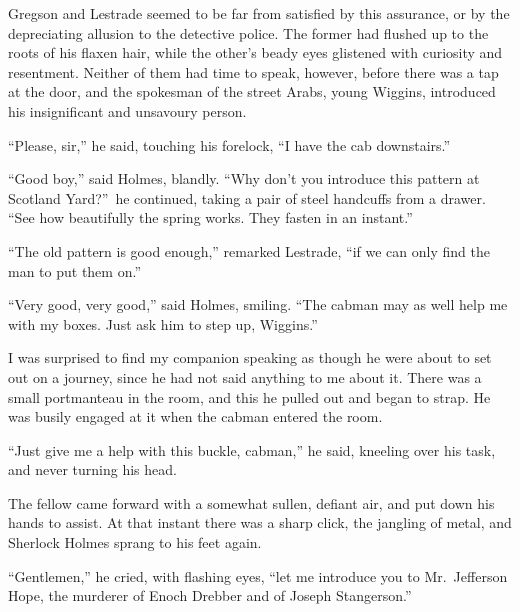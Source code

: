 \documentclass[12pt,english,oneside]{book}
\begin{document}
Gregson and Lestrade seemed to be far from satisfied by this assurance,
or by the depreciating allusion to the detective police. The former
had flushed up to the roots of his flaxen hair, while the other's
beady eyes glistened with curiosity and resentment. Neither of them
had time to speak, however, before there was a tap at the door, and
the spokesman of the street Arabs, young Wiggins, introduced his insignificant
and unsavoury person.

{}``Please, sir,'' he said, touching his forelock, {}``I have the
cab downstairs.''

{}``Good boy,'' said Holmes, blandly. {}``Why don't you introduce
this pattern at Scotland Yard?''\ he continued, taking a pair of
steel handcuffs from a drawer. {}``See how beautifully the spring
works. They fasten in an instant.''

{}``The old pattern is good enough,'' remarked Lestrade, {}``if
we can only find the man to put them on.''

{}``Very good, very good,'' said Holmes, smiling. {}``The cabman
may as well help me with my boxes. Just ask him to step up, Wiggins.''

I was surprised to find my companion speaking as though he were about
to set out on a journey, since he had not said anything to me about
it. There was a small portmanteau in the room, and this he pulled
out and began to strap. He was busily engaged at it when the cabman
entered the room.

{}``Just give me a help with this buckle, cabman,'' he said, kneeling
over his task, and never turning his head.

The fellow came forward with a somewhat sullen, defiant air, and put
down his hands to assist. At that instant there was a sharp click,
the jangling of metal, and Sherlock Holmes sprang to his feet again.

{}``Gentlemen,'' he cried, with flashing eyes, {}``let me introduce
you to Mr.\ Jefferson Hope, the murderer of Enoch Drebber and of
Joseph Stangerson.''
\end{document}
